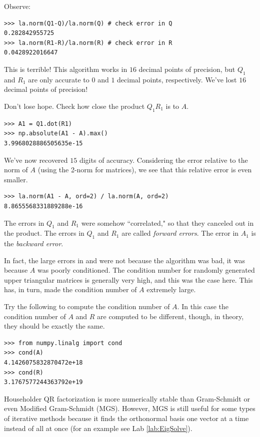 Observe:

\begin{lstlisting}
>>> la.norm(Q1-Q)/la.norm(Q) # check error in Q
0.282842955725
>>> la.norm(R1-R)/la.norm(R) # check error in R
0.0428922016647
\end{lstlisting}

This is terrible!
This algorithm works in $16$ decimal points of precision, but $Q_1$ and $R_1$ are only accurate to $0$ and $1$ decimal points, respectively.
We've lost $16$ decimal points of precision!

Don't lose hope.
Check how close the product $Q_1 R_1$ is to $A$.
\begin{lstlisting}
>>> A1 = Q1.dot(R1)
>>> np.absolute(A1 - A).max()
3.9968028886505635e-15
\end{lstlisting}
We've now recovered $15$ digits of accuracy.
Considering the error relative to the norm of $A$ (using the 2-norm for matrices), we see that this relative error is even smaller.
\begin{lstlisting}
>>> la.norm(A1 - A, ord=2) / la.norm(A, ord=2)
8.8655568331889288e-16
\end{lstlisting}
The errors in $Q_1$ and $R_1$ were somehow ``correlated," so that they canceled out in the product.
The errors in $Q_1$ and $R_1$ are called \emph{forward errors}.
The error in $A_1$ is the \emph{backward error}.

In fact, the large errors in  and  were not because the algorithm was bad, it was because $A$ was poorly conditioned.
The condition number for randomly generated upper triangular matrices is generally very high, and this was the case here.
This has, in turn, made the condition number of $A$ extremely large.

Try the following to compute the condition number of $A$.
In this case the condition number of $A$ and $R$ are computed to be different, though, in theory, they should be exactly the same.
\begin{lstlisting}
>>> from numpy.linalg import cond
>>> cond(A)
4.1426075832870472e+18
>>> cond(R)
3.1767577244363792e+19
\end{lstlisting}

Householder QR factorization is more numerically stable than Gram-Schmidt or even Modified Gram-Schmidt (MGS).
However, MGS is still useful for some types of iterative methods because it finds the orthonormal basis one vector at a time instead of all at once (for an example see Lab \ref{lab:EigSolve}).

